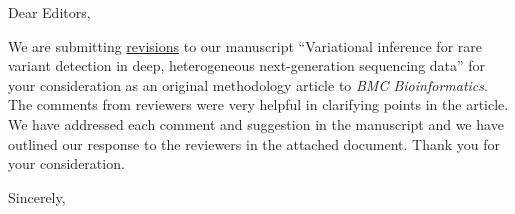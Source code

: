 \documentclass[11pt,letterpaper]{letter} %
\begin{document}
\vspace{\fill}
\begin{letter}{}

\opening{Dear Editors,}

We are submitting \underline{revisions} to our manuscript ``Variational inference for rare variant detection in deep, heterogeneous next-generation sequencing data'' for your consideration as an original methodology article to \textit{BMC Bioinformatics}.
The comments from reviewers were very helpful in clarifying points in the article.
We have addressed each comment and suggestion in the manuscript and we have outlined our response to the reviewers in the attached document.
Thank you for your consideration.

\closing{Sincerely,}

\vspace{\fill}
\end{letter}
\end{document}
